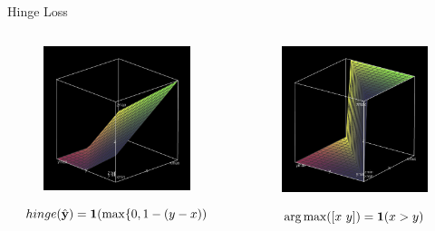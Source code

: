 \documentclass{beamer}
\begin{document}





\begin{frame}{Hinge Loss}
  \begin{columns}[t]
    \begin{column}[t]{0.5\textwidth}


      \begin{figure}
        \centering
        \includegraphics[width=5cm]{hinge}

      \end{figure}
      \[hinge(\hat{\mathbf{y}}) = \mathbf{1}(\max\{0, 1 - (y - x)) \]
    \end{column}

    \begin{column}[t]{0.5\textwidth}


      \begin{figure}
        \centering
      \includegraphics[width=5cm]{argmax}
      \end{figure}
      \[\argmax([x\ y]) = \indicator(x > y) \]      
    \end{column}
  \end{columns}
\end{frame}  
\end{document}
